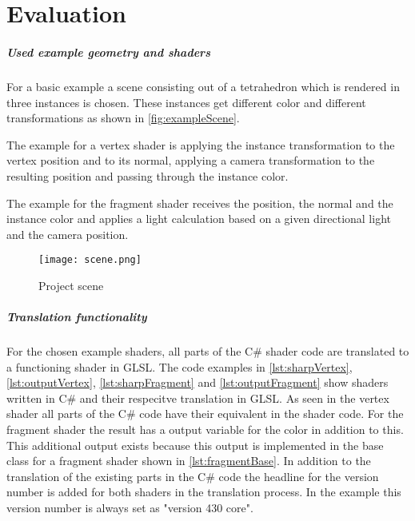 
\chapter{Evaluation}\label{cha:Evaluation}

\paragraph{Used example geometry and shaders}

For a basic example a scene consisting out of a tetrahedron which is rendered in three instances is chosen. These instances get different color and different transformations as shown in  \autoref{fig:exampleScene}.

The example for a vertex shader is applying the instance transformation to the vertex position and to its normal, applying a camera transformation to the resulting position and passing through the instance color.

The example for the fragment shader receives the position, the normal and the instance color and applies a light calculation based on a given directional light and the camera position.

\begin{figure}[h!]
  \centering 
  \texttt{[image: scene.png]}
  \caption[Screenshot of example scene of the project]{Project scene}
  \label{fig:exampleScene}
\end{figure}

\paragraph{Translation functionality}

For the chosen example shaders, all parts of the C\# shader code are translated to a functioning shader in GLSL. The code examples in \autoref{lst:sharpVertex},\autoref{lst:outputVertex}, \autoref{lst:sharpFragment} and \autoref{lst:outputFragment} show shaders written in C\# and their respecitve translation in GLSL. As seen in the vertex shader all parts of the C\# code have their equivalent in the shader code. For the fragment shader the result has a output variable for the color in addition to this. This additional output exists because this output is implemented in the base class for a fragment shader shown in \autoref{lst:fragmentBase}. In addition to the translation of the existing parts in the C\# code the headline for the version number is added for both shaders in the translation process. In the example this version number is always set as "version 430 core".

